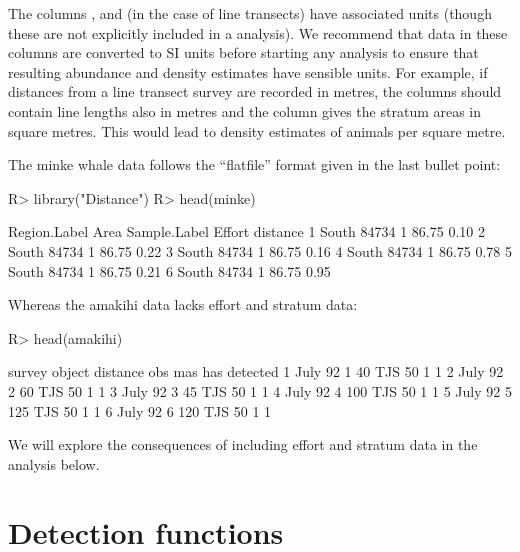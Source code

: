 \documentclass[article,shortnames]{jss}
\begin{document}
The columns ,  and (in the case of line
transects)  have associated units (though these are not
explicitly included in a  analysis). We recommend that
data in these columns are converted to SI units before starting any
analysis to ensure that resulting abundance and density estimates have
sensible units. For example, if distances from a line transect survey
are recorded in metres, the  columns should contain line
lengths also in metres and the  column gives the stratum
areas in square metres. This would lead to density estimates of animals
per square metre.

The minke whale data follows the ``flatfile'' format given in the last
bullet point:

\begin{CodeChunk}
\begin{CodeInput}
R> library("Distance")
R> head(minke)
\end{CodeInput}
\begin{CodeOutput}
  Region.Label  Area Sample.Label Effort distance
1        South 84734            1  86.75     0.10
2        South 84734            1  86.75     0.22
3        South 84734            1  86.75     0.16
4        South 84734            1  86.75     0.78
5        South 84734            1  86.75     0.21
6        South 84734            1  86.75     0.95
\end{CodeOutput}
\end{CodeChunk}

Whereas the amakihi data lacks effort and stratum data:

\begin{CodeChunk}
\begin{CodeInput}
R> head(amakihi)
\end{CodeInput}
\begin{CodeOutput}
   survey object distance obs mas has detected
1 July 92      1       40 TJS  50   1        1
2 July 92      2       60 TJS  50   1        1
3 July 92      3       45 TJS  50   1        1
4 July 92      4      100 TJS  50   1        1
5 July 92      5      125 TJS  50   1        1
6 July 92      6      120 TJS  50   1        1
\end{CodeOutput}
\end{CodeChunk}

We will explore the consequences of including effort and stratum data in
the analysis below.

\section{Detection functions}\label{detection-functions}
\end{document}
